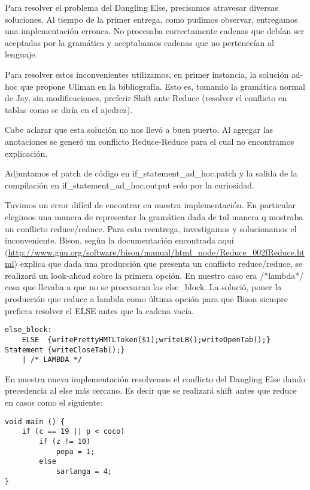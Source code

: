 \documentclass[a4paper,spanish]{article}
\begin{document}
Para resolver el problema del Dangling Else, precisamos atravesar diversas soluciones.
Al tiempo de la primer entrega, como pudimos observar, entregamos una implementaci\'on erronea. No procesaba correctamente cadenas que deb\'ian ser aceptadas por la gram\'atica y aceptabamos cadenas que no pertenec\'ian al lenguaje.

Para resolver estos inconvenientes utilizamos, en primer instancia, la soluci\'on ad-hoc que propone Ullman en la bibliograf\'ia. Esto es, tomando la gram\'atica normal de Jay, sin modificaciones, preferir Shift ante Reduce (resolver el conflicto en tablas como se dir\'ia en el ajedrez).

Cabe aclarar que esta soluci\'on no nos llev\'o a buen puerto. Al agregar las anotaciones se gener\'o un conflicto Reduce-Reduce para el cual no encontramos explicaci\'on.

Adjuntamos el patch de c\'odigo en if\_statement\_ad\_hoc.patch y la salida de la compilaci\'on en if\_statement\_ad\_hoc.output solo por la curiosidad.

Tuvimos un error dif\'icil de encontrar en nuestra implementaci\'on. En particular elegimos una manera de representar la gram\'atica dada de tal manera q mostraba un conflicto reduce/reduce. Para esta reentrega, investigamos y solucionamos el inconveniente. Bison, seg\'un la documentaci\'on encontrada aqu\'i (\url{http://www.gnu.org/software/bison/manual/html_node/Reduce_002fReduce.html}) explica que dada una producci\'on que presenta un conflicto reduce/reduce, se realizar\'a un look-ahead sobre la primera opci\'on. En nuestro caso era /*lambda*/ cosa que llevaba a que no se procesaran los else\_block. La soluci\'o, poner la producci\'on que reduce a lambda como \'ultima opci\'on para que Bison siempre prefiera resolver el ELSE antes que la cadena vac\'ia.

\begin{verbatim}
else_block:  
	ELSE  {writePrettyHMTLToken($1);writeLB();writeOpenTab();} Statement {writeCloseTab();}
	| /* LAMBDA */ 

\end{verbatim}

En nuestra nueva implementaci\'on resolvemos el conflicto del Dangling Else dando precedencia al else m\'as cercano. Es decir que se realizar\'a shift antes que reduce en casos como el siguiente:


\begin{verbatim}
void main () { 
    if (c == 19 || p < coco) 
        if (z != 10) 
            pepa = 1;
        else 
            sarlanga = 4; 
}
\end{verbatim}
\end{document}

